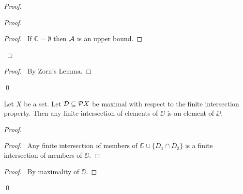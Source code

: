 \begin{proof}
    \pf
    \begin{proof}
        \begin{proof}
            \pf\ If $\mathbb{C} = \emptyset$ then $\AA$ is an upper bound.
        \end{proof}
    \end{proof}
    \qedstep
    \begin{proof}
        \pf\ By Zorn's Lemma.
    \end{proof}
    \qed
\end{proof}

\begin{lemma}
    \label{lemma:finite_intersection_maximal}
    Let $X$ be a set. Let $\DD \subseteq \pow X$ be maximal with respect to the finite intersection property.
    Then any finite intersection of elements of $\DD$ is an element of $\DD$.
\end{lemma}

\begin{proof}
    \pf
    \begin{proof}
        \pf\ Any finite intersection of members of $\DD \cup \{ D_1 \cap D_2 \}$
        is a finite intersection of members of $\DD$.
    \end{proof}
    \begin{proof}
        \pf\ By maximality of $\DD$.
    \end{proof}
    \qed
\end{proof}

